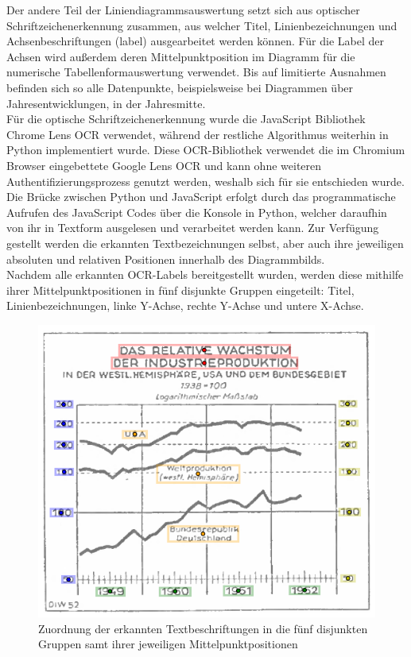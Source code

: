 Der andere Teil der Liniendiagrammsauswertung setzt sich aus optischer Schriftzeichenerkennung zusammen, aus welcher Titel, Linienbezeichnungen und Achsenbeschriftungen (label) ausgearbeitet werden können. Für die Label der Achsen wird außerdem deren Mittelpunktposition im Diagramm für die numerische Tabellenformauswertung verwendet. Bis auf limitierte Ausnahmen befinden sich so alle Datenpunkte, beispielsweise bei Diagrammen über Jahresentwicklungen, in der Jahresmitte.
\\
Für die optische Schriftzeichenerkennung wurde die JavaScript Bibliothek Chrome Lens OCR \cite{dimden2024chromelensocr} verwendet, während der restliche Algorithmus weiterhin in Python implementiert wurde. Diese OCR-Bibliothek verwendet die im Chromium Browser eingebettete Google Lens OCR und kann ohne weiteren Authentifizierungsprozess genutzt werden, weshalb sich für sie entschieden wurde. Die Brücke zwischen Python und JavaScript erfolgt durch das programmatische Aufrufen des JavaScript Codes über die Konsole in Python, welcher daraufhin von ihr in Textform ausgelesen und verarbeitet werden kann. Zur Verfügung gestellt werden die erkannten Textbezeichnungen selbst, aber auch ihre jeweiligen absoluten und relativen Positionen innerhalb des Diagrammbilds.
\\
Nachdem alle erkannten OCR-Labels bereitgestellt wurden, werden diese mithilfe ihrer Mittelpunktpositionen in fünf disjunkte Gruppen eingeteilt: Titel, Linienbezeichnungen, linke Y-Achse, rechte Y-Achse und untere X-Achse.

\begin{figure}[H]
    \centering
    \captionsetup{width=.75\linewidth}
    \includegraphics[width=.75\textwidth]{Implementation/img/ocr.png}
    \caption{ Zuordnung der erkannten Textbeschriftungen in die fünf disjunkten Gruppen samt ihrer jeweiligen Mittelpunktpositionen}
    \label{fig:ocr}
\end{figure}

